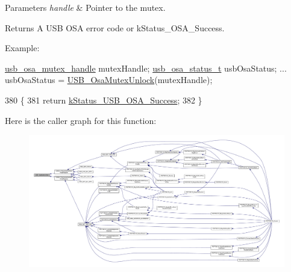 \begin{DoxyParams}{Parameters}
{\em handle} & Pointer to the mutex.\\
\hline
\end{DoxyParams}
\begin{DoxyReturn}{Returns}
A U\-S\-B O\-S\-A error code or k\-Status\-\_\-\-O\-S\-A\-\_\-\-Success.
\end{DoxyReturn}
Example\-: 
\begin{DoxyCode}
\hyperlink{group__usb__os__abstraction_gad259d0dfe125b11cccaf93163ef915fd}{usb\_osa\_mutex\_handle} mutexHandle;
\hyperlink{group__usb__os__abstraction_ga8de2fb7579de0a6621bbc1776519b0a9}{usb\_osa\_status\_t}     usbOsaStatus;
...
usbOsaStatus = \hyperlink{group__usb__os__abstraction_gaad3249273d566eae00e2cea81192315a}{USB\_OsaMutexUnlock}(mutexHandle);
\end{DoxyCode}
 
\begin{DoxyCode}
380 \{
381     \textcolor{keywordflow}{return} \hyperlink{group__usb__os__abstraction_gga453ebd2f93aafb8c938c3a23c815f9bdab90805fb75297fda1ca60dbb2283f933}{kStatus\_USB\_OSA\_Success};
382 \}
\end{DoxyCode}


Here is the caller graph for this function\-:
\nopagebreak
\begin{figure}[H]
\begin{center}
\leavevmode
\includegraphics[width=350pt]{group__usb__os__abstraction_gaad3249273d566eae00e2cea81192315a_icgraph}
\end{center}
\end{figure}


